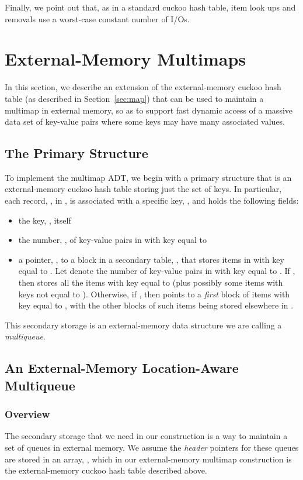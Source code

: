 \documentclass[11pt,letterpaper]{article}
\begin{document}
Finally, we point out that, as in a standard cuckoo hash table,
item look ups and removals use a worst-case constant number of I/Os.

\section{External-Memory Multimaps}
\label{sec:multimap}
In this section, we describe an extension of the external-memory cuckoo
hash table (as described in Section~\ref{sec:map})
that can be used to maintain a multimap in external
memory, so as to support fast dynamic access of a massive
data set of key-value pairs where some keys may have many associated
values.

\subsection{The Primary Structure}
To implement the multimap ADT, we begin with a primary structure that
is an external-memory cuckoo hash table storing just the set of keys.
In particular,
each record, , in , is associated with a specific key, , and
holds the following fields:
\begin{itemize}
\item
the key, , itself
\item
the number, , of key-value pairs in  with key equal to  \item
a pointer, , to a block  
in a secondary table, ,
that stores items in  with key equal to . 
Let  denote the number of key-value pairs in  with key equal to . If , then 
stores all the items with key equal to  (plus possibly some items with
keys not equal to ).
Otherwise, if , then  points to a \emph{first} block
of items with key equal to , with the other blocks of such items
being stored elsewhere in .
\end{itemize}

This secondary storage is an external-memory data structure we
are calling a \emph{multiqueue}.

\subsection{An External-Memory Location-Aware Multiqueue}
\label{sec:multiqueue}
\subsubsection{Overview}
The secondary storage
that we need in our construction is a
way to maintain a set  of queues in external memory.
We assume
the \emph{header} pointers for these queues are 
stored in an array, ,
which in our external-memory multimap construction is the
external-memory cuckoo hash table described above.
\end{document}
